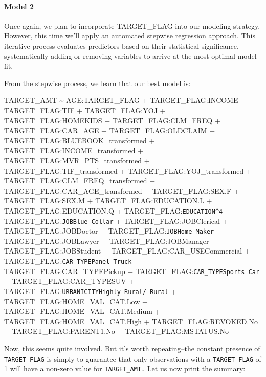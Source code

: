 \documentclass[
]{article}
\begin{document}
\paragraph{Model 2}\label{model-2-1}

Once again, we plan to incorporate TARGET\_FLAG into our modeling
strategy. However, this time we'll apply an automated stepwise
regression approach. This iterative process evaluates predictors based
on their statistical significance, systematically adding or removing
variables to arrive at the most optimal model fit.

From the stepwise process, we learn that our best model is:

TARGET\_AMT \textasciitilde{} AGE:TARGET\_FLAG + TARGET\_FLAG:INCOME +
TARGET\_FLAG:TIF + TARGET\_FLAG:YOJ + TARGET\_FLAG:HOMEKIDS +
TARGET\_FLAG:CLM\_FREQ + TARGET\_FLAG:CAR\_AGE + TARGET\_FLAG:OLDCLAIM +
TARGET\_FLAG:BLUEBOOK\_transformed + TARGET\_FLAG:INCOME\_transformed +
TARGET\_FLAG:MVR\_PTS\_transformed + TARGET\_FLAG:TIF\_transformed +
TARGET\_FLAG:YOJ\_transformed + TARGET\_FLAG:CLM\_FREQ\_transformed +
TARGET\_FLAG:CAR\_AGE\_transformed + TARGET\_FLAG:SEX.F +
TARGET\_FLAG:SEX.M + TARGET\_FLAG:EDUCATION.L + TARGET\_FLAG:EDUCATION.Q
+ TARGET\_FLAG:\texttt{EDUCATION\^{}4} +
TARGET\_FLAG:\texttt{JOBBlue\ Collar} + TARGET\_FLAG:JOBClerical +
TARGET\_FLAG:JOBDoctor + TARGET\_FLAG:\texttt{JOBHome\ Maker} +
TARGET\_FLAG:JOBLawyer + TARGET\_FLAG:JOBManager +
TARGET\_FLAG:JOBStudent + TARGET\_FLAG:CAR\_USECommercial +
TARGET\_FLAG:\texttt{CAR\_TYPEPanel\ Truck} +
TARGET\_FLAG:CAR\_TYPEPickup +
TARGET\_FLAG:\texttt{CAR\_TYPESports\ Car} + TARGET\_FLAG:CAR\_TYPESUV +
TARGET\_FLAG:\texttt{URBANICITYHighly\ Rural/\ Rural} +
TARGET\_FLAG:HOME\_VAL\_CAT.Low + TARGET\_FLAG:HOME\_VAL\_CAT.Medium +
TARGET\_FLAG:HOME\_VAL\_CAT.High + TARGET\_FLAG:REVOKED.No +
TARGET\_FLAG:PARENT1.No + TARGET\_FLAG:MSTATUS.No

Now, this seems quite involved. But it's worth repeating--the constant
presence of \texttt{TARGET\_FLAG} is simply to guarantee that only
observations with a \texttt{TARGET\_FLAG} of 1 will have a non-zero
value for \texttt{TARGET\_AMT.} Let us now print the summary:
\end{document}
